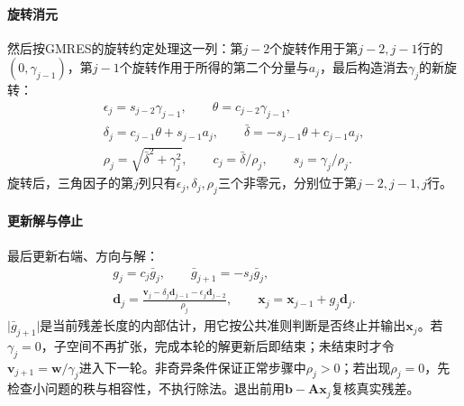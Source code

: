\paragraph{旋转消元}
然后按GMRES的旋转约定处理这一列：第$j-2$个旋转作用于第$j-2,j-1$行的$(0,\gamma_{j-1})$，第$j-1$个旋转作用于所得的第二个分量与$a_j$，最后构造消去$\gamma_j$的新旋转：
\[
 \begin{gathered}
 \epsilon_j=s_{j-2}\gamma_{j-1},\qquad \theta=c_{j-2}\gamma_{j-1},\\
 \delta_j=c_{j-1}\theta+s_{j-1}a_j,\qquad
 \bar\delta=-s_{j-1}\theta+c_{j-1}a_j,\\
 \rho_j=\sqrt{\bar\delta^2+\gamma_j^2},\qquad
 c_j=\bar\delta/\rho_j,\qquad s_j=\gamma_j/\rho_j .
 \end{gathered}
\]
旋转后，三角因子的第$j$列只有$\epsilon_j,\delta_j,\rho_j$三个非零元，分别位于第$j-2,j-1,j$行。

\paragraph{更新解与停止}
最后更新右端、方向与解：
\[
 \begin{gathered}
 g_j=c_j\bar g_j,\qquad \bar g_{j+1}=-s_j\bar g_j,\\
 \bm d_j=\frac{\bm v_j-\delta_j\bm d_{j-1}-\epsilon_j\bm d_{j-2}}{\rho_j},\qquad
 \bm x_j=\bm x_{j-1}+g_j\bm d_j .
 \end{gathered}
\]
$\lvert\bar g_{j+1}\rvert$是当前残差长度的内部估计，用它按公共准则判断是否终止并输出$\bm x_j$。若$\gamma_j=0$，子空间不再扩张，完成本轮的解更新后即结束；未结束时才令$\bm v_{j+1}=\bm w/\gamma_j$进入下一轮。非奇异条件保证正常步骤中$\rho_j>0$；若出现$\rho_j=0$，先检查小问题的秩与相容性，不执行除法。退出前用$\bm b-\bm A\bm x_j$复核真实残差。

